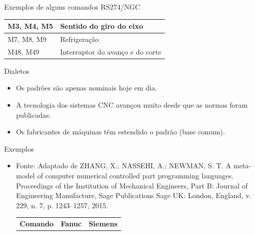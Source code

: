 \documentclass[aspectratio=169]{beamer}
\begin{document}
{\begin{frame}{Exemplos de alguns comandos RS274/NGC}
\begin{table}[H]
\begin{tabular}{p{7cm}|p{5cm}}
      \hline
      \scriptsize{M3, M4, M5}
      & \scriptsize{Sentido do giro do eixo} \\
  
      \hline
      \scriptsize{M7, M8, M9}
      & \scriptsize{Refrigera\c c\~ao} \\
  
      \hline
      \scriptsize{M48, M49}
      & \scriptsize{Interruptor do avan\c co e do corte} \\

      \hline
  
    \end{tabular}
  \end{table}

\end{frame}



\begin{frame}{Dialetos}
  \begin{itemize}
  \item {
    Os padrões são apenas nominais hoje em dia.     
  }
  \item {   
    A tecnologia dos sistemas CNC avançou muito desde que as normas foram publicadas.
  }
  \item {
    Os fabricantes de máquinas têm estendido o padrão (base comum). 
  }
  \end{itemize}
\end{frame}



\begin{frame}{Exemplos}
  \begin{itemize}
    \item {
      Fonte: Adaptado de ZHANG, X.; NASSEHI, A.; NEWMAN, S. T. A meta-model of computer numerical
      controlled part programming languages. Proceedings of the Institution of
      Mechanical Engineers, Part B: Journal of Engineering Manufacture, Sage
      Publications Sage UK: London, England, v. 229, n. 7, p. 1243–1257, 2015.
      \begin{table}[H]
        \centering    
        {\begin{tabular}{p{4.3cm}|p{2.6cm}|p{2.4cm}}
          \hline
          \bfseries{\footnotesize{Comando}} & 
          \bfseries{\footnotesize{Fanuc}} & 
          \bfseries{\footnotesize{Siemens}} \\
      

\end{tabular}}
\end{table}}
\end{itemize}
\end{frame}}
\end{document}
